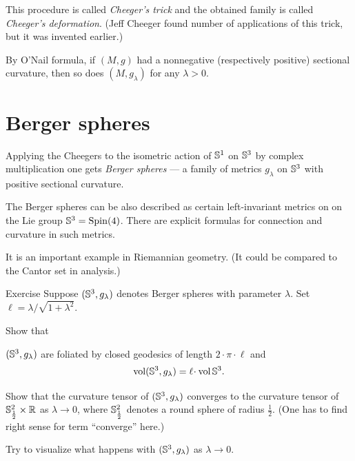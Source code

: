 This procedure is called \emph{Cheeger's trick} and the obtained family is called \emph{Cheeger's deformation}.
(Jeff Cheeger found number of applications of this trick, but it was invented earlier.)

By O'Nail formula, if $(M,g)$ had a nonnegative (respectively positive) sectional curvature, then so does $(M,g_\lambda)$ for any $\lambda>0$.

\section{Berger spheres}

Applying the Cheegers to the isometric action of $\mathbb{S}^1$ on $\mathbb{S}^3$ by complex multiplication one gets \emph{Berger spheres} --- a family of metrics $g_\lambda$ on $\mathbb{S}^3$ with positive sectional curvature.

The Berger spheres can be also described as certain left-invariant metrics on on the Lie group $\mathbb{S}^3=\operatorname{\rm Spin}\nolimits(4)$.
There are explicit formulas for connection and curvature in such metrics.

It is an important example in Riemannian geometry.
(It could be compared to the Cantor set in analysis.)

\begin{thm}{Exercise}
Suppose $(\mathbb{S}^3,g_\lambda)$ denotes Berger spheres with parameter $\lambda$.
Set $\ell=\lambda/\sqrt{1+\lambda^2}$.

Show that

\begin{subthm}{}
$(\mathbb{S}^3,g_\lambda)$ are foliated by closed geodesics of length $2\cdot\pi\cdot\ell$
and 
\[\vol(\SSS^3,g_\lambda)=\ell\cdot\vol\SSS^3.\]
\end{subthm}

\begin{subthm}{}
Show that the curvature tensor of $(\mathbb{S}^3,g_\lambda)$ converges to the curvature tensor of $\mathbb{S}^2_{\frac12}\times\mathbb{R}$ as $\lambda\to0$, where $\mathbb{S}^2_{\frac12}$ denotes a round sphere of radius $\tfrac 12$.
(One has to find right sense for term ``converge'' here.)
\end{subthm}

\begin{subthm}{}
Try to visualize what happens with  $(\mathbb{S}^3,g_\lambda)$ as $\lambda\to0$.
\end{subthm}


 \end{thm}





